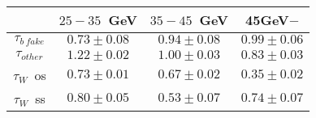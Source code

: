 \centering
\begin{tabular}{|c|c|c|c|} \hline
 & $25-35$~GeV & $35-45$~GeV & 45GeV$-$\\\hline
$\tau_{b~fake}$ & $0.73\pm0.08$ & $0.94\pm0.08$ & $0.99\pm0.06$\\\hline
$\tau_{other}$ & $1.22\pm0.02$ & $1.00\pm0.03$ & $0.83\pm0.03$\\\hline
$\tau_{W}$~os & $0.73\pm0.01$ & $0.67\pm0.02$ & $0.35\pm0.02$\\\hline
$\tau_{W}$~ss & $0.80\pm0.05$ & $0.53\pm0.07$ & $0.74\pm0.07$\\\hline
\end{tabular}
